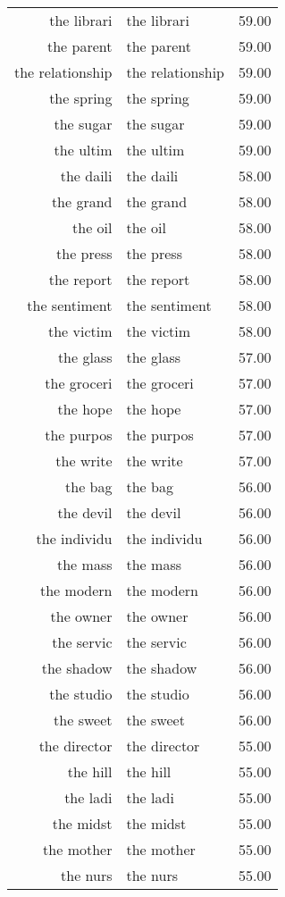 \begin{table}[ht]
\begin{tabular}{rlr}
  the librari & the librari & 59.00 \\ 
  the parent & the parent & 59.00 \\ 
  the relationship & the relationship & 59.00 \\ 
  the spring & the spring & 59.00 \\ 
  the sugar & the sugar & 59.00 \\ 
  the ultim & the ultim & 59.00 \\ 
  the daili & the daili & 58.00 \\ 
  the grand & the grand & 58.00 \\ 
  the oil & the oil & 58.00 \\ 
  the press & the press & 58.00 \\ 
  the report & the report & 58.00 \\ 
  the sentiment & the sentiment & 58.00 \\ 
  the victim & the victim & 58.00 \\ 
  the glass & the glass & 57.00 \\ 
  the groceri & the groceri & 57.00 \\ 
  the hope & the hope & 57.00 \\ 
  the purpos & the purpos & 57.00 \\ 
  the write & the write & 57.00 \\ 
  the bag & the bag & 56.00 \\ 
  the devil & the devil & 56.00 \\ 
  the individu & the individu & 56.00 \\ 
  the mass & the mass & 56.00 \\ 
  the modern & the modern & 56.00 \\ 
  the owner & the owner & 56.00 \\ 
  the servic & the servic & 56.00 \\ 
  the shadow & the shadow & 56.00 \\ 
  the studio & the studio & 56.00 \\ 
  the sweet & the sweet & 56.00 \\ 
  the director & the director & 55.00 \\ 
  the hill & the hill & 55.00 \\ 
  the ladi & the ladi & 55.00 \\ 
  the midst & the midst & 55.00 \\ 
  the mother & the mother & 55.00 \\ 
  the nurs & the nurs & 55.00 \\ 

\end{tabular}
\end{table}
